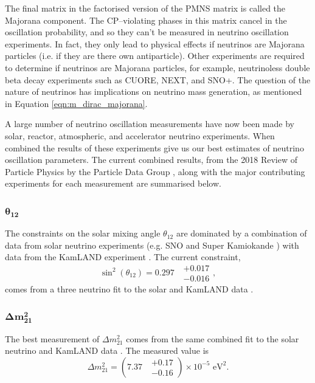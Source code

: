 The final matrix in the factorised version of the PMNS matrix is called the 
Majorana component. The CP--violating phases in this matrix cancel in the 
oscillation probability, and so they can't be measured in neutrino oscillation 
experiments.  In fact, they only lead to physical effects if neutrinos are 
Majorana particles (i.e. if they are there own antiparticle). Other experiments 
are required to determine if neutrinos are Majorana particles, for example, 
neutrinoless double beta decay experiments such as CUORE\cite{Arnaboldi2004}, 
NEXT\cite{Alvarez2012}, and SNO+\cite{Andringa2016}. The question of the 
nature of neutrinos has implications on neutrino mass generation, as mentioned 
in Equation \ref{eqn:m_dirac_majorana}.

A large number of neutrino oscillation measurements have now been made by
solar, reactor, atmospheric, and accelerator neutrino experiments. When combined
the results of these experiments give us our best estimates of neutrino 
oscillation parameters. The current combined results, from the 2018 
Review of Particle Physics by the Particle Data Group \cite{PhysRevD.98.030001},
along with the major contributing experiments for each measurement are 
summarised below.

\subsubsection*{$\boldsymbol{\theta_{12}}$}

The constraints on the solar mixing angle $\theta_{12}$ are dominated by a
combination of data from solar neutrino experiments (e.g. SNO \cite{Ahmad2002}
and Super Kamiokande \cite{PhysRevLett.86.5651}) with data from the KamLAND 
experiment \cite{Araki2005}. The current constraint,
\begin{equation}
	\label{eqn:theta_12}
	\sin^2(\theta_{12}) = 0.297 \mbox{ } \substack{+ 0.017 \\ - 0.016},
\end{equation}
comes from a three neutrino fit to the solar and KamLAND data 
\cite{Capozzi:2016rtj}.

\subsubsection*{$\boldsymbol{\Delta m^2_{21}}$}

The best measurement of $\Delta m^2_{21}$ comes from the same combined fit to 
the solar neutrino and KamLAND data \cite{Capozzi:2016rtj}. The measured value
is
\begin{equation}
	\label{eqn:delta_m_21}
	\Delta m^2_{21} = (7.37 \mbox{ } \substack{+ 0.17 \\ - 0.16}) \times 10^{-5} \mbox{  eV}^2.
\end{equation}

